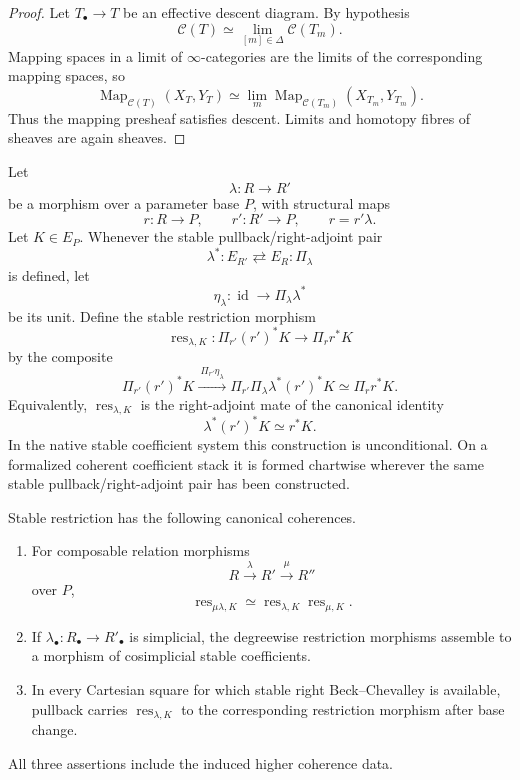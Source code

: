 \begin{proof}
Let $T_\bullet\to T$ be an effective descent diagram.  By hypothesis
\[
\mathcal C(T)\simeq\lim_{[m]\in\Delta}\mathcal C(T_m).
\]
Mapping spaces in a limit of $\infty$-categories are the limits of the corresponding
mapping spaces, so
\[
\operatorname{Map}_{\mathcal C(T)}(X_T,Y_T)
\simeq
\lim_m
\operatorname{Map}_{\mathcal C(T_m)}(X_{T_m},Y_{T_m}).
\]
Thus the mapping presheaf satisfies descent.  Limits and homotopy fibres of sheaves
are again sheaves.
\end{proof}



\begin{construction}
\label{constr:symmetry-noether-stable-restriction-along-a-relation-morphism}
Let
\[
\lambda:R\longrightarrow R'
\]
be a morphism over a parameter base $P$, with structural maps
\[
r:R\longrightarrow P,
\qquad
r':R'\longrightarrow P,
\qquad
r=r'\lambda.
\]
Let $K\in E_P$.  Whenever the stable pullback/right-adjoint pair
\[
\lambda^*:E_{R'}\rightleftarrows E_R:\Pi_\lambda
\]
is defined, let
\[
\eta_\lambda:\operatorname{id}\longrightarrow\Pi_\lambda\lambda^*
\]
be its unit.  Define the stable restriction morphism
\[
\boxed{
\operatorname{res}_{\lambda,K}:
\Pi_{r'}(r')^*K
\longrightarrow
\Pi_r r^*K
}
\]
by the composite
\[
\Pi_{r'}(r')^*K
\xrightarrow{\ \Pi_{r'}\eta_\lambda\ }
\Pi_{r'}\Pi_\lambda\lambda^*(r')^*K
\simeq
\Pi_r r^*K.
\]
Equivalently, $\operatorname{res}_{\lambda,K}$ is the right-adjoint mate of the
canonical identity
\[
\lambda^*(r')^*K\simeq r^*K.
\]
In the native stable coefficient system this construction is unconditional.  On a
formalized coherent coefficient stack it is formed chartwise wherever the same
stable pullback/right-adjoint pair has been constructed.
\end{construction}

\begin{lemma}
\label{lem:symmetry-noether-stable-restriction-composition-base-change}
Stable restriction has the following canonical coherences.
\begin{enumerate}
\item For composable relation morphisms
      \[
      R\xrightarrow{\lambda}R'\xrightarrow{\mu}R''
      \]
      over $P$,
      \[
      \operatorname{res}_{\mu\lambda,K}
      \simeq
      \operatorname{res}_{\lambda,K}
      \operatorname{res}_{\mu,K}.
      \]
\item If $\lambda_\bullet:R_\bullet\to R'_\bullet$ is simplicial, the degreewise
      restriction morphisms assemble to a morphism of cosimplicial stable
      coefficients.
\item In every Cartesian square for which stable right Beck--Chevalley is available,
      pullback carries $\operatorname{res}_{\lambda,K}$ to the corresponding
      restriction morphism after base change.
\end{enumerate}
All three assertions include the induced higher coherence data.
\end{lemma}


